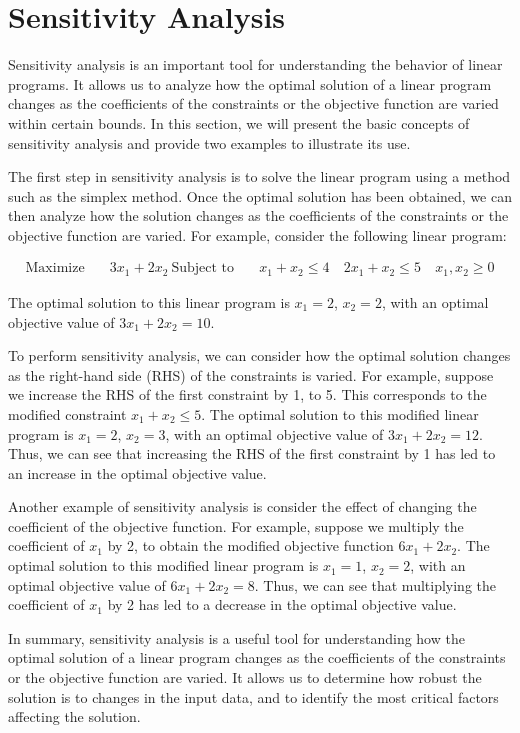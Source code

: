 
\chapter{Sensitivity Analysis}

Sensitivity analysis is an important tool for understanding the behavior of linear programs. It allows us to analyze how the optimal solution of a linear program changes as the coefficients of the constraints or the objective function are varied within certain bounds. In this section, we will present the basic concepts of sensitivity analysis and provide two examples to illustrate its use.

The first step in sensitivity analysis is to solve the linear program using a method such as the simplex method. Once the optimal solution has been obtained, we can then analyze how the solution changes as the coefficients of the constraints or the objective function are varied. For example, consider the following linear program:

\begin{align*}
\text{Maximize} \quad & 3x_1 + 2x_2 \
\text{Subject to} \quad & x_1 + x_2 \leq 4 \
& 2x_1 + x_2 \leq 5 \
& x_1, x_2 \geq 0
\end{align*}

The optimal solution to this linear program is $x_1 = 2$, $x_2 = 2$, with an optimal objective value of $3x_1 + 2x_2 = 10$.

To perform sensitivity analysis, we can consider how the optimal solution changes as the right-hand side (RHS) of the constraints is varied. For example, suppose we increase the RHS of the first constraint by 1, to 5. This corresponds to the modified constraint $x_1 + x_2 \leq 5$. The optimal solution to this modified linear program is $x_1 = 2$, $x_2 = 3$, with an optimal objective value of $3x_1 + 2x_2 = 12$. Thus, we can see that increasing the RHS of the first constraint by 1 has led to an increase in the optimal objective value.

Another example of sensitivity analysis is consider the effect of changing the coefficient of the objective function. For example, suppose we multiply the coefficient of $x_1$ by 2, to obtain the modified objective function $6x_1 + 2x_2$. The optimal solution to this modified linear program is $x_1 = 1$, $x_2 = 2$, with an optimal objective value of $6x_1 + 2x_2 = 8$. Thus, we can see that multiplying the coefficient of $x_1$ by 2 has led to a decrease in the optimal objective value.

In summary, sensitivity analysis is a useful tool for understanding how the optimal solution of a linear program changes as the coefficients of the constraints or the objective function are varied. It allows us to determine how robust the solution is to changes in the input data, and to identify the most critical factors affecting the solution.